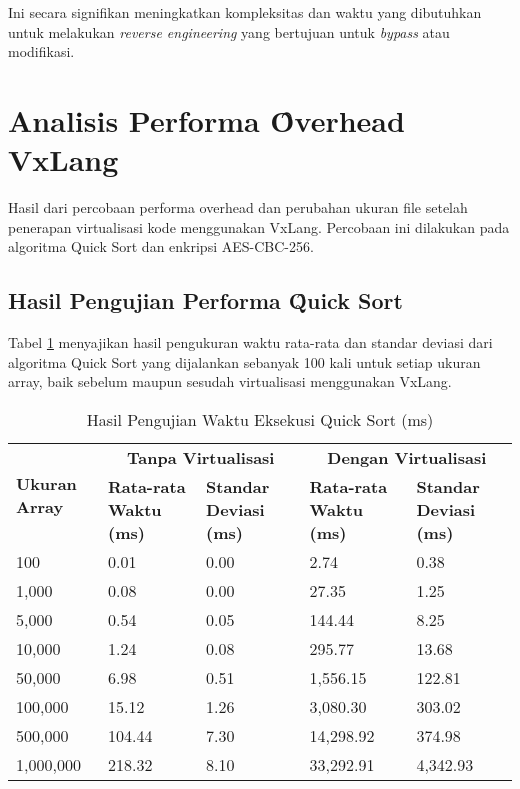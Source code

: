  Ini secara signifikan meningkatkan kompleksitas dan waktu yang dibutuhkan untuk melakukan \textit{reverse engineering} yang bertujuan untuk \textit{bypass} atau modifikasi.

\section{Analisis Performa \f{Overhead} VxLang}
Hasil dari percobaan performa overhead dan perubahan ukuran file setelah penerapan virtualisasi kode menggunakan VxLang. Percobaan ini dilakukan pada algoritma Quick Sort dan enkripsi AES-CBC-256.

\subsection{Hasil Pengujian Performa \f{Quick Sort}}
Tabel \ref{tab:quick_sort_performance} menyajikan hasil pengukuran waktu rata-rata dan standar deviasi dari algoritma Quick Sort yang dijalankan sebanyak 100 kali untuk setiap ukuran array, baik sebelum maupun sesudah virtualisasi menggunakan VxLang. 

\begin{table}[H] %
    \centering
    \caption{Hasil Pengujian Waktu Eksekusi Quick Sort (ms)}
    \label{tab:quick_sort_performance}
    \begin{tabularx}{\textwidth}{@{}|X|X|X|X|X|@{}}
    \hline
        \multirow{2}{*}{\textbf{Ukuran Array}} & \multicolumn{2}{c|}{\textbf{Tanpa Virtualisasi}} & \multicolumn{2}{c|}{\textbf{Dengan Virtualisasi}}\\
        \cline{2-5}
        & \textbf{Rata-rata Waktu (ms)} & \textbf{Standar Deviasi (ms)} & \textbf{Rata-rata Waktu (ms)} & \textbf{Standar Deviasi (ms)}\\
        \hline
        100                     & 0.01 & 0.00 & 2.74 & 0.38 \\
        \hline
        1,000                   & 0.08 & 0.00 & 27.35 & 1.25 \\
        \hline
        5,000                   & 0.54 & 0.05 & 144.44 & 8.25 \\
        \hline
        10,000                  & 1.24 & 0.08 & 295.77 & 13.68 \\
        \hline
        50,000                  & 6.98 & 0.51 & 1,556.15 & 122.81 \\
        \hline
        100,000                 & 15.12 & 1.26 & 3,080.30 & 303.02 \\
        \hline
        500,000                 & 104.44 & 7.30 & 14,298.92 & 374.98 \\
        \hline
        1,000,000               & 218.32 & 8.10 & 33,292.91 & 4,342.93 \\
        \hline
    \end{tabularx}
\end{table}

